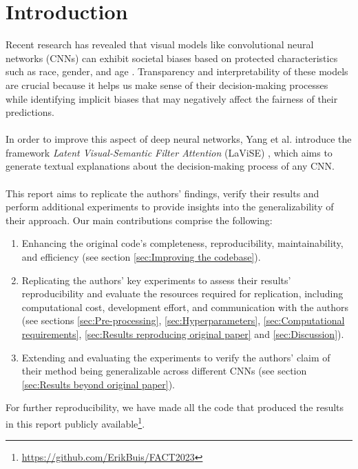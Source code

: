 \newcommand{\Feat}{\text{Feat}}
\newcommand{\Exp}{\text{Exp}}
\captionsetup[table]{skip=2pt}


\section{Introduction} \label{sec:Introduction}
Recent research has revealed that visual models like convolutional neural networks (CNNs) can exhibit societal biases based on protected characteristics such as race, gender, and age \cite{buolamwini2018gender, das2018mitigating, kortylewski2018empirically, wang2020mitigating, hendricks2018women}.
Transparency and interpretability of these models are crucial because it helps us make sense of their decision-making processes while identifying implicit biases that may negatively affect the fairness of their predictions.
\\\\
In order to improve this aspect of deep neural networks, Yang et al. introduce the framework \textit{Latent Visual-Semantic Filter Attention} (LaViSE) \cite{yang2022explaining}, which aims to generate textual explanations about the decision-making process of any CNN.
\\\\
This report aims to replicate the authors' findings, verify their results and perform additional experiments to provide insights into the generalizability of their approach. Our main contributions comprise the following:
\begin{enumerate}
    \item Enhancing the original code's completeness, reproducibility, maintainability, and efficiency (see section \ref{sec:Improving the codebase}).
    \item Replicating the authors' key experiments to assess their results' reproducibility and evaluate the resources required for replication, including computational cost, development effort, and communication with the authors (see sections \ref{sec:Pre-processing}, \ref{sec:Hyperparameters}, \ref{sec:Computational requirements}, \ref{sec:Results reproducing original paper} and \ref{sec:Discussion}).
    \item Extending and evaluating the experiments to verify the authors' claim of their method being generalizable across different CNNs (see section \ref{sec:Results beyond original paper}).
\end{enumerate}
For further reproducibility, we have made all the code that produced the results in this report publicly available\footnote{\url{https://github.com/ErikBuis/FACT2023}}.


